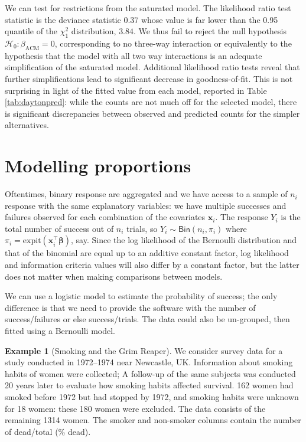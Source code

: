 \documentclass[
  11pt,
  letterpaper,
]{book}
\theoremstyle{definition}
\theoremstyle{definition}
\newtheorem{example}{Example}[chapter]
\theoremstyle{definition}
\theoremstyle{definition}
\theoremstyle{remark}
\begin{document}
We can test for restrictions from the saturated model. The likelihood ratio test statistic is the deviance statistic 0.37 whose value is far lower than the 0.95 quantile of the \(\chi^2_1\) distribution, \(3.84\). We thus fail to reject the null hypothesis \(\mathscr{H}_0:\beta_{\mathrm{ACM}}=0\), corresponding to no three-way interaction or equivalently to the hypothesis that the model with all two way interactions is an adequate simplification of the saturated model. Additional likelihood ratio tests reveal that further simplifications lead to significant decrease in goodness-of-fit. This is not surprising in light of the fitted value from each model, reported in Table \ref{tab:daytonpred}: while the counts are not much off for the selected model, there is significant discrepancies between observed and predicted counts for the simpler alternatives.

\hypertarget{modelling-proportions}{%
\section{Modelling proportions}\label{modelling-proportions}}

Oftentimes, binary response are aggregated and we have access to a sample of \(n_i\) response with the same explanatory variables: we have multiple successes and failures observed for each combination of the covariates \(\mathbf{x}_i\). The response \(Y_i\) is the total number of success out of \(n_i\) trials, so \(Y_i \sim \mathsf{Bin}(n_i, \pi_i)\) where \(\pi_i = \mathrm{expit}(\mathbf{x}_i^\top\boldsymbol{\beta})\), say. Since the log likelihood of the Bernoulli distribution and that of the binomial are equal up to an additive constant factor, log likelihood and information criteria values will also differ by a constant factor, but the latter does not matter when making comparisons between models.

We can use a logistic model to estimate the probability of success; the only difference is that we need to provide the software with the number of success/failures or else success/trials. The data could also be un-grouped, then fitted using a Bernoulli model.

\begin{example}[Smoking and the Grim Reaper]
\protect\hypertarget{exm:smokingSimpson}{}\label{exm:smokingSimpson}We consider survey data for a study conducted in 1972--1974 near Newcastle, UK. Information about smoking habits of women were collected; A follow-up of the same subjects was conducted 20 years later to evaluate how smoking habits affected survival. 162 women had smoked before 1972 but had stopped by 1972, and smoking habits were unknown for 18 women: these 180 women were excluded.
The data consists of the remaining 1314 women. The smoker and non-smoker columns contain the number of dead/total (\% dead).
\end{example}
\end{document}
